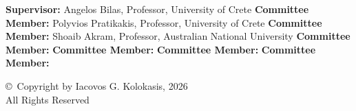 \cleardoublepage


\fontsize{11.5}{14}\selectfont

\title{\thesistitle}
%
\author{Iacovos G. Kolokasis}
%
%
\date{Heraklion, November 2026}
%
%
%
%
\CommitteeMembers
%
{\textbf{\small Supervisor:} \small Angelos Bilas, Professor, University of Crete}
%
{\textbf{\small Committee Member:} \small Polyvios Pratikakis, Professor, University of Crete}
%
{\textbf{\small Committee Member:} \small Shoaib Akram, Professor, Australian National University}
%
{\textbf{\small Committee Member:} \small }
%
{\textbf{\small Committee Member:} \small }
%
{\textbf{\small Committee Member:} \small }
%
{\textbf{\small Committee Member:} \small }



\maketitlepage

\newpage \thispagestyle{empty}
\begin{center}
	\copyright\ Copyright by Iacovos G. Kolokasis, 2026 \\ All Rights Reserved
\end{center}
\vspace*{\fill}


\cleardoublepage


\makesigpage

\newpage
%
\pagestyle{plain}
%
\thispagestyle{empty}
%
\mbox{}
%
\clearpage


